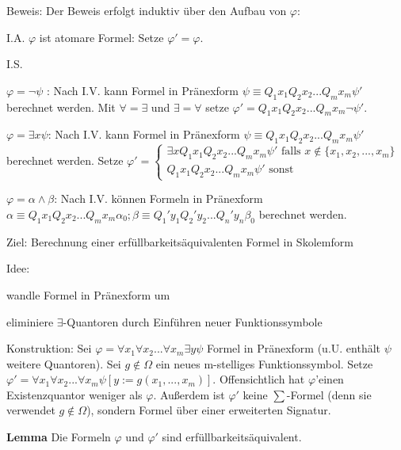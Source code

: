 \documentclass[a4paper]{article}
\renewcommand{\note}[2]{\begin{noteBox} \textbf{#1} #2 \end{noteBox}}
\begin{document}
\begin{multicols}{3}
  Beweis: Der Beweis erfolgt induktiv über den Aufbau von $\varphi$:
  \begin{itemize*}
    \item I.A. $\varphi$ ist atomare Formel: Setze $\varphi'=\varphi$.
    \item I.S.
    \begin{itemize*}
      \item $\varphi=\lnot\psi$ : Nach I.V. kann Formel in Pränexform $\psi\equiv Q_1 x_1 Q_2 x_2 ...Q_m x_m \psi'$ berechnet werden. Mit $\forall=\exists$ und $\exists=\forall$ setze $\varphi'=Q_1 x_1 Q_2 x_2 ...Q_m x_m\lnot\psi'$.
      \item $\varphi=\exists x\psi$: Nach I.V. kann Formel in Pränexform $\psi\equiv Q_1 x_1 Q_2 x_2 ...Q_m x_m \psi'$ berechnet werden. Setze $\varphi'= \begin{cases} \exists x Q_1 x_1 Q_2 x_2 ...Q_m x_m\psi'\text{ falls }x\not\in\{x_1,x_2,...,x_m\}\\ Q_1 x_1 Q_2 x_2 ...Q_m x_m\psi'\text{ sonst}\end{cases}$
      \item $\varphi=\alpha\wedge\beta$: Nach I.V. können Formeln in Pränexform $\alpha\equiv Q_1 x_1 Q_2 x_2 ...Q_mx_m \alpha_0; \beta\equiv Q_1'y_1 Q_2'y_2 ...Q_n'y_n \beta_0$ berechnet werden.
    \end{itemize*}
  \end{itemize*}

  Ziel: Berechnung einer erfüllbarkeitsäquivalenten Formel in Skolemform

  Idee:
  \begin{enumerate*}
    \item wandle Formel in Pränexform um
    \item eliminiere $\exists$-Quantoren durch Einführen neuer Funktionssymbole
  \end{enumerate*}

  Konstruktion: Sei $\varphi=\forall x_1\forall x_2...\forall x_m\exists y\psi$ Formel in Pränexform (u.U. enthält $\psi$ weitere Quantoren). Sei $g\not\in\Omega$ ein neues m-stelliges Funktionssymbol.
  Setze $\varphi'=\forall x_1\forall x_2...\forall x_m \psi[y:=g(x_1,...,x_m)]$.
  Offensichtlich hat $\varphi$'einen Existenzquantor weniger als $\varphi$. Außerdem ist $\varphi'$ keine $\sum$-Formel (denn sie verwendet $g\not\in\Omega$), sondern Formel über einer erweiterten Signatur.

  \note{Lemma}{Die Formeln $\varphi$ und $\varphi'$ sind erfüllbarkeitsäquivalent.}


\end{multicols}
\end{document}
